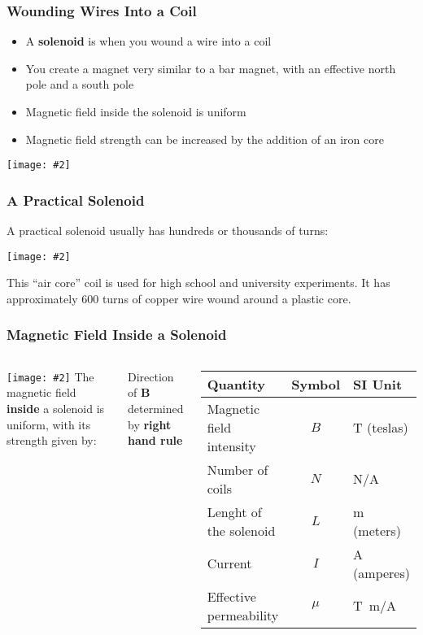 \documentclass[12pt,aspectratio=169]{beamer}
\newcommand{\pic}[2]{\texttt{[image: \#2]}}
\newcommand{\mb}[1]{\mathbf{#1}}
\newcommand{\eq}[2]{\vspace{#1}{\Large\begin{displaymath}#2\end{displaymath}}}
\begin{document}
\begin{frame}
  \frametitle{Wounding Wires Into a Coil}
  \begin{itemize}
  \item A \textbf{solenoid} is when you wound a wire into a coil
  \item You create a magnet very similar to a bar magnet, with an effective
    north pole and a south pole
  \item Magnetic field inside the solenoid is uniform
  \item Magnetic field strength can be increased by the addition of an iron core
  \end{itemize}
  \begin{center}
    \pic{.5}{barsol.png}
  \end{center}
\end{frame}

\begin{frame}
  \frametitle{A Practical Solenoid}
  A practical solenoid usually has hundreds or thousands of turns:

  \vspace{-.2in}
  \begin{center}
    \pic{.45}{1020201515330450255.jpg}
  \end{center}

  \vspace{-.2in}
  This ``air core'' coil is used for high school and university experiments. It
  has approximately 600 turns of copper wire wound around a plastic core.
\end{frame}

\begin{frame}
  \frametitle{Magnetic Field Inside a Solenoid}
  \begin{columns}
    \pic{1.1}{magneticfield4.png}
    The magnetic field \textbf{inside} a solenoid is uniform, with its strength
    given by:
    
    \eq{-.2in}{
      \boxed{B=\frac{\mu NI}{L}}
    }
    Direction of $\mb{B}$ determined by \textbf{right hand rule}
      \vspace{-.1in}
      \begin{center}
        \begin{tabular}{l|c|l}
          \rowcolor{pink}
          \textbf{Quantity} & \textbf{Symbol} & \textbf{SI Unit} \\ \hline
          Magnetic field intensity & $B$ & \si{\tesla} (teslas)\\
          Number of coils          & $N$ & N/A\\
          Lenght of the solenoid   & $L$ & \si{\meter} (meters)\\
          Current                  & $I$ & \si{\ampere} (amperes)\\
          Effective permeability & $\mu$ & \si{T.m/A}
        \end{tabular}
      \end{center}
  \end{columns}
\end{frame}
\end{document}
